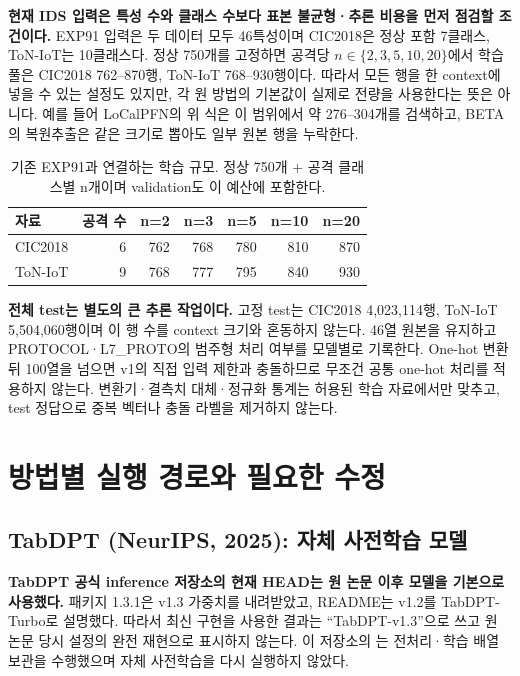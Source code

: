 \textbf{현재 IDS 입력은 특성 수와 클래스 수보다 표본 불균형·추론 비용을 먼저 점검할 조건이다.} EXP91 입력은 두 데이터 모두 46특성이며 CIC2018은 정상 포함 7클래스, ToN-IoT는 10클래스다. 정상 750개를 고정하면 공격당 $n\in\{2,3,5,10,20\}$에서 학습 풀은 CIC2018 762--870행, ToN-IoT 768--930행이다. 따라서 모든 행을 한 context에 넣을 수 있는 설정도 있지만, 각 원 방법의 기본값이 실제로 전량을 사용한다는 뜻은 아니다. 예를 들어 LoCalPFN의 위 식은 이 범위에서 약 276--304개를 검색하고, BETA의 복원추출은 같은 크기로 뽑아도 일부 원본 행을 누락한다.

\begin{table}[H]\centering\small
\caption{기존 EXP91과 연결하는 학습 규모. 정상 750개 + 공격 클래스별 n개이며 validation도 이 예산에 포함한다.}
\begin{tabular}{lrrrrrr}\toprule
자료 & 공격 수 & n=2 & n=3 & n=5 & n=10 & n=20\\\midrule
CIC2018 & 6 & 762 & 768 & 780 & 810 & 870\\
ToN-IoT & 9 & 768 & 777 & 795 & 840 & 930\\\bottomrule
\end{tabular}
\end{table}

\textbf{전체 test는 별도의 큰 추론 작업이다.} 고정 test는 CIC2018 4,023,114행, ToN-IoT 5,504,060행이며 이 행 수를 context 크기와 혼동하지 않는다. 46열 원본을 유지하고 PROTOCOL·L7\_PROTO의 범주형 처리 여부를 모델별로 기록한다. One-hot 변환 뒤 100열을 넘으면 v1의 직접 입력 제한과 충돌하므로 무조건 공통 one-hot 처리를 적용하지 않는다. 변환기·결측치 대체·정규화 통계는 허용된 학습 자료에서만 맞추고, test 정답으로 중복 벡터나 충돌 라벨을 제거하지 않는다.

\section{방법별 실행 경로와 필요한 수정}
\subsection{TabDPT (NeurIPS, 2025): 자체 사전학습 모델}
\textbf{TabDPT 공식 inference 저장소의 현재 HEAD는 원 논문 이후 모델을 기본으로 사용했다.} 패키지 1.3.1은 v1.3 가중치를 내려받았고, README는 v1.2를 TabDPT-Turbo로 설명했다. 따라서 최신 구현을 사용한 결과는 ``TabDPT-v1.3''으로 쓰고 원 논문 당시 설정의 완전 재현으로 표시하지 않는다. 이 저장소의 는 전처리·학습 배열 보관을 수행했으며 자체 사전학습을 다시 실행하지 않았다.

